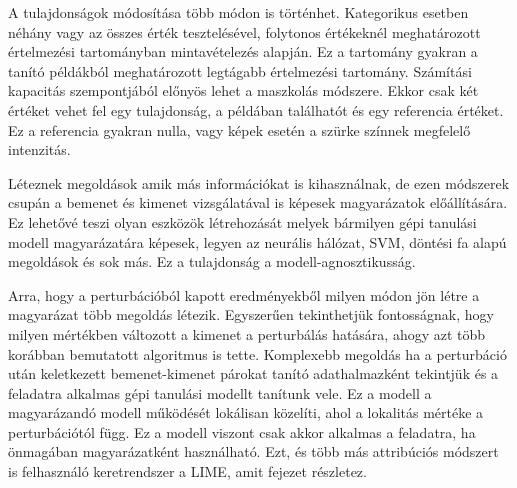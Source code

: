A tulajdonságok módosítása több módon is történhet. Kategorikus esetben néhány vagy az összes érték tesztelésével, folytonos értékeknél meghatározott értelmezési tartományban mintavételezés alapján. Ez a tartomány gyakran a tanító példákból meghatározott legtágabb értelmezési tartomány. Számítási kapacitás szempontjából előnyös lehet a maszkolás módszere. Ekkor csak két értéket vehet fel egy tulajdonság, a példában találhatót és egy referencia értéket. Ez a referencia gyakran nulla, vagy képek esetén a szürke színnek megfelelő intenzitás.

Léteznek megoldások amik más információkat is kihasználnak, de ezen módszerek csupán a bemenet és kimenet vizsgálatával is képesek magyarázatok előállítására. Ez lehetővé teszi olyan eszközök létrehozását melyek bármilyen gépi tanulási modell magyarázatára képesek, legyen az neurális hálózat, SVM, döntési fa alapú megoldások és sok más. Ez a tulajdonság a modell-agnosztikusság. 

Arra, hogy a perturbációból kapott eredményekből milyen módon jön létre a magyarázat több megoldás létezik. Egyszerűen tekinthetjük fontosságnak, hogy milyen mértékben változott a kimenet a perturbálás hatására, ahogy azt több korábban bemutatott algoritmus is tette. Komplexebb megoldás ha a perturbáció után keletkezett bemenet-kimenet párokat tanító adathalmazként tekintjük és a feladatra alkalmas gépi tanulási modellt tanítunk vele. Ez a modell a magyarázandó modell működését lokálisan közelíti, ahol a lokalitás mértéke a perturbációtól függ. Ez a modell viszont csak akkor alkalmas a feladatra, ha önmagában magyarázatként használható. Ezt, és több más attribúciós módszert is felhasználó keretrendszer a LIME, amit  fejezet részletez.